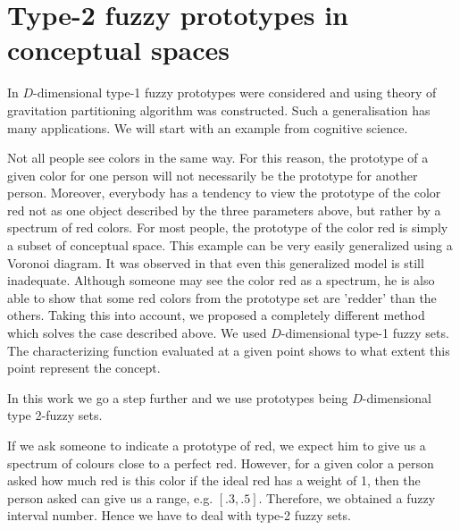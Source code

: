 \documentclass[leqno,12pt]{amsart}
\theoremstyle{remark}
\theoremstyle{remark}
\theoremstyle{remark}
\theoremstyle{definition}
\numberwithin{equation}{section}
\begin{document}
\section{Type-2 fuzzy prototypes in conceptual spaces}\label{lingapp}
In \cite{UG} $D$-dimensional type-1 fuzzy prototypes were considered and using theory of gravitation partitioning algorithm was constructed. Such a generalisation has many applications.
We will start with an example from cognitive science.
\par
Not all people see colors in the same way. For this reason, the prototype of
a given color for one person will not necessarily be the prototype for another person. Moreover,
everybody has a tendency to view the prototype of the color red not as one object described by the
three parameters above, but rather by a spectrum of red colors. For most people, the prototype of
the color red is simply a subset of conceptual space. This example can be very easily generalized
using a Voronoi diagram. It was observed in \cite{UG} that even this generalized model is still inadequate. Although someone may see the color
red as a spectrum, he is also able to show that some red colors from the prototype set are
'redder' than the others. Taking this into account, we proposed a completely different method which
solves the case described above.
We used $D$-dimensional type-1 fuzzy sets. The characterizing function evaluated at a given point shows to what extent this point represent the concept.
\par
In this work we go a step further and we use prototypes being $D$-dimensional type 2-fuzzy sets.
\par
If we ask someone to indicate a prototype of red, we expect him to give us a spectrum of colours close to a perfect red. However, for a given color a person asked how much red is this color if the ideal red has a weight of 1, then the person asked can give us a range, e.g. $[.3,.5].$ Therefore, we obtained a fuzzy interval number. Hence we have to deal with type-2 fuzzy sets.
\end{document}

